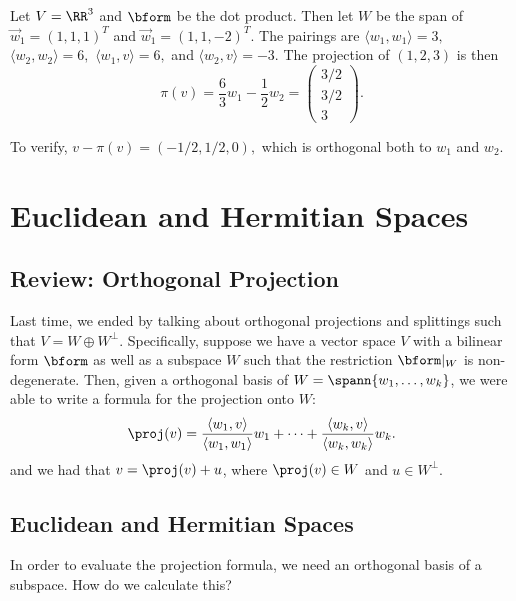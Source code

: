 \begin{example}
Let $V = \RR^3$ and $\bform$ be the dot product. Then let $W$ be the span of $\vec{w}_1 = (1, 1, 1)^T$ and $\vec{w}_1 = (1, 1, -2)^T.$ The pairings are $\langle w_1, w_1 \rangle = 3,$ $\langle w_2, w_2 \rangle = 6,$ $\langle w_1, v \rangle = 6,$ and $\langle w_2, v \rangle = -3.$ The projection of $(1, 2, 3)$ is then 
\[
\pi(v) = \frac{6}{3}w_1 -\frac{1}{2}w_2 = \begin{pmatrix}3/2 \\ 3/2 \\ 3\end{pmatrix}.
\]

To verify, $v - \pi(v) = (-1/2, 1/2, 0),$ which is orthogonal both to $w_1$ and $w_2.$
\end{example}

\newpage


\section{Euclidean and Hermitian Spaces}

\subsection{Review: Orthogonal Projection}
Last time, we ended by talking about orthogonal projections and splittings such that $V = W \oplus W^\perp$.
Specifically, suppose we have a vector space $V$ with a bilinear form $\bform$ as well as a subspace $W$ such that the restriction $\bform|_W$ is non-degenerate.
Then, given a orthogonal basis of $W = \spann \{ w_1, \ldots, w_k\}$, we were able to write a formula for the projection onto $W$:
\[\proj(v) = \frac{\langle w_1, v \rangle}{\langle w_1, w_1 \rangle } w_1 + \cdots + \frac{\langle w_k , v \rangle}{\langle w_k, w_k \rangle} w_k.\]
and we had that $v = \proj(v) + u$, where $\proj(v) \in W$ and $u \in W^\perp$. 

\subsection{Euclidean and Hermitian Spaces}
In order to evaluate the projection formula, we need an orthogonal basis of a subspace. How do we calculate this?

